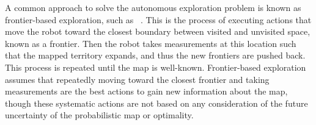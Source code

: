 \documentclass[smallextended]{svjour3}       %
\begin{document}
A common approach to solve the autonomous exploration problem is known as frontier-based exploration, such as ~\cite{Yam97,Yam98}. This is the process of executing actions that move the robot toward the closest boundary between visited and unvisited space, known as a frontier.
Then the robot takes measurements at this location such that the mapped territory expands, and thus the new frontiers are pushed back. This process is repeated until the map is well-known.
Frontier-based exploration assumes that repeatedly moving toward the closest frontier and taking measurements are the best actions to gain new information about the map, though these systematic actions are not based on any consideration of the future uncertainty of the probabilistic map or optimality.

\end{document}
